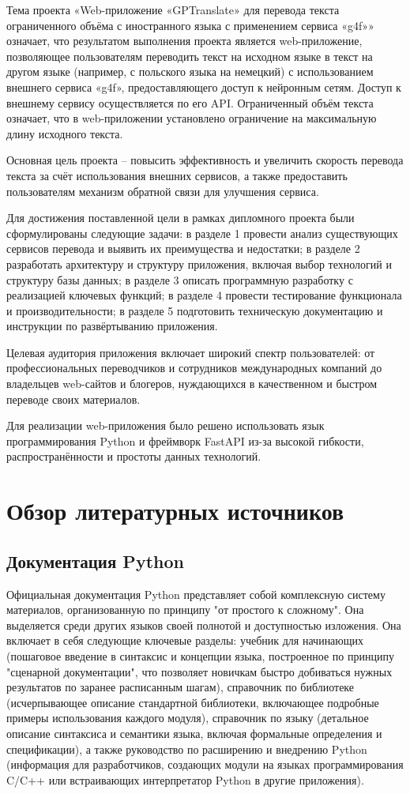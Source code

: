 \documentclass[14pt]{extarticle}
\begin{document}
Тема проекта «Web-приложение «GPTranslate» для перевода текста ограниченного объёма с иностранного языка с применением сервиса «g4f»» означает, что результатом выполнения проекта является web-приложение, позволяющее пользователям переводить текст на исходном языке в текст на другом языке (например, с польского языка на немецкий) с использованием внешнего сервиса «g4f», предоставляющего доступ к нейронным сетям. Доступ к внешнему сервису осуществляется по его API. Ограниченный объём текста означает, что в web-приложении установлено ограничение на максимальную длину исходного текста.

Основная цель проекта – повысить эффективность и увеличить скорость перевода текста за счёт использования внешних сервисов, а также предоставить пользователям механизм обратной связи для улучшения сервиса.

Для достижения поставленной цели в рамках дипломного проекта были сформулированы следующие задачи: в разделе 1 провести анализ существующих сервисов перевода и выявить их преимущества и недостатки; в разделе 2 разработать архитектуру и структуру приложения, включая выбор технологий и структуру базы данных; в разделе 3 описать программную разработку с реализацией ключевых функций; в разделе 4 провести тестирование функционала и производительности; в разделе 5 подготовить техническую документацию и инструкции по развёртыванию приложения.

Целевая аудитория приложения включает широкий спектр пользователей: от профессиональных переводчиков и сотрудников международных компаний до владельцев web-сайтов и блогеров, нуждающихся в качественном и быстром переводе своих материалов.

Для реализации web-приложения было решено использовать язык программирования Python и фреймворк FastAPI из-за высокой гибкости, распространённости и простоты данных технологий.

\clearpage
\section{Обзор литературных источников}
\subsection{Документация Python}

Официальная документация Python представляет собой комплексную систему материалов, организованную по принципу "от простого к сложному". Она выделяется среди других языков своей полнотой и доступностью изложения. Она включает в себя следующие ключевые разделы: учебник для начинающих (пошаговое введение в синтаксис и концепции языка, построенное по принципу "сценарной документации", что позволяет новичкам быстро добиваться нужных результатов по заранее расписанным шагам), справочник по библиотеке (исчерпывающее описание стандартной библиотеки, включающее подробные примеры использования каждого модуля), справочник по языку (детальное описание синтаксиса и семантики языка, включая формальные определения и спецификации), а также руководство по расширению и внедрению Python (информация для разработчиков, создающих модули на языках программирования C/C++ или встраивающих интерпретатор Python в другие приложения).
\end{document}
